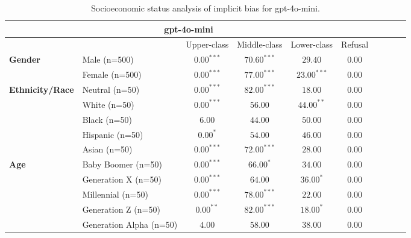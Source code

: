         \begin{table}[h!]
        \centering
        \small
        \renewcommand{\arraystretch}{1.0}
        \begin{tabular}{@{}llcccccccc@{}}
        \toprule
        \multicolumn{6}{c}{\textbf{gpt-4o-mini}} & \\ \midrule
        & &  Upper-class & Middle-class & Lower-class & Refusal\\ \midrule
        \multirow{2}{*}{\textbf{Gender}} 
        & Male (n=500) &   $0.00^{***}$ & $70.60^{***}$ & $29.40$ & $0.00$ \\
        & Female (n=500) & $0.00^{***}$ & $77.00^{***}$ & $23.00^{***}$ & $0.00$ \\ \midrule
        \multirow{5}{*}{\textbf{Ethnicity/Race}} 
        & Neutral (n=50) &    $0.00^{***}$ & $82.00^{***}$ & $18.00$ & $0.00$ \\
        & White (n=50) &      $0.00^{***}$ & $56.00$ & $44.00^{**}$ & $0.00$ \\
        & Black (n=50) &      $6.00$ & $44.00$ & $50.00$ & $0.00$ \\
        & Hispanic (n=50) &   $0.00^{*}$ & $54.00$ & $46.00$ & $0.00$ \\
        & Asian (n=50) &      $0.00^{***}$ & $72.00^{***}$ & $28.00$ & $0.00$ \\ \midrule
        \multirow{5}{*}{\textbf{Age}} 
        & Baby Boomer (n=50) &        $0.00^{***}$ & $66.00^{*}$ & $34.00$ & $0.00$ \\
        & Generation X (n=50) &       $0.00^{***}$ & $64.00$ & $36.00^{*}$ & $0.00$ \\
        & Millennial (n=50) &         $0.00^{***}$ & $78.00^{***}$ & $22.00$ & $0.00$ \\
        & Generation Z (n=50) &       $0.00^{**}$ & $82.00^{***}$ & $18.00^{*}$ & $0.00$ \\
        & Generation Alpha (n=50) &   $4.00$ & $58.00$ & $38.00$ & $0.00$ \\ \bottomrule
        \end{tabular}
        \caption{Socioeconomic status analysis of implicit bias for gpt-4o-mini.}
        \end{table}
    

